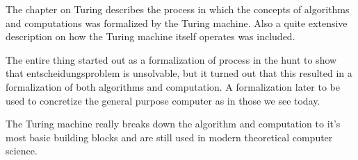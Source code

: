 \documentclass{article}
\begin{document}
    The chapter on Turing describes the process in which the concepts of
    algorithms and computations was formalized by the Turing machine. 
    Also a quite extensive description on how the Turing machine itself
    operates was included.

    The entire thing started out as a formalization of process in the hunt to show that
    entscheidungsproblem is unsolvable, but it turned out that this resulted in
    a formalization of both algorithms and computation. A formalization later to
    be used to concretize the general purpose computer as in those we see today.

    The Turing machine really breaks down the algorithm and computation to it's
    most basic building blocks and are still used in modern theoretical computer
    science.
\end{document}
